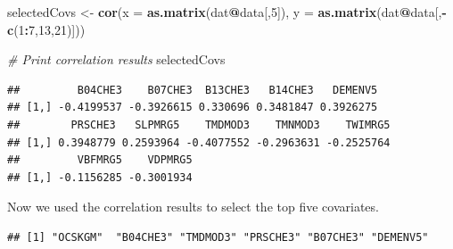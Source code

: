 \documentclass[10pt,b5paper,]{book}
\newenvironment{Shaded}{\begin{snugshade}}{\end{snugshade}}
\newcommand{\CommentTok}[1]{\textcolor[rgb]{0.56,0.35,0.01}{\textit{#1}}}
\newcommand{\DataTypeTok}[1]{\textcolor[rgb]{0.13,0.29,0.53}{#1}}
\newcommand{\DecValTok}[1]{\textcolor[rgb]{0.00,0.00,0.81}{#1}}
\newcommand{\KeywordTok}[1]{\textcolor[rgb]{0.13,0.29,0.53}{\textbf{#1}}}
\newcommand{\NormalTok}[1]{#1}
\newcommand{\OperatorTok}[1]{\textcolor[rgb]{0.81,0.36,0.00}{\textbf{#1}}}
\newcommand{\OtherTok}[1]{\textcolor[rgb]{0.56,0.35,0.01}{#1}}
\newcommand{\StringTok}[1]{\textcolor[rgb]{0.31,0.60,0.02}{#1}}
\theoremstyle{definition}
\theoremstyle{definition}
\theoremstyle{definition}
\theoremstyle{remark}
\begin{document}
\begin{Shaded}
\begin{Highlighting}[]
\NormalTok{selectedCovs <-}\StringTok{ }\KeywordTok{cor}\NormalTok{(}\DataTypeTok{x =} \KeywordTok{as.matrix}\NormalTok{(dat}\OperatorTok{@}\NormalTok{data[,}\DecValTok{5}\NormalTok{]),}
           \DataTypeTok{y =} \KeywordTok{as.matrix}\NormalTok{(dat}\OperatorTok{@}\NormalTok{data[,}\OperatorTok{-}\KeywordTok{c}\NormalTok{(}\DecValTok{1}\OperatorTok{:}\DecValTok{7}\NormalTok{,}\DecValTok{13}\NormalTok{,}\DecValTok{21}\NormalTok{)]))}

\CommentTok{# Print correlation results}
\NormalTok{selectedCovs}
\end{Highlighting}
\end{Shaded}

\begin{verbatim}
##         B04CHE3    B07CHE3  B13CHE3   B14CHE3   DEMENV5
## [1,] -0.4199537 -0.3926615 0.330696 0.3481847 0.3926275
##        PRSCHE3   SLPMRG5    TMDMOD3    TMNMOD3    TWIMRG5
## [1,] 0.3948779 0.2593964 -0.4077552 -0.2963631 -0.2525764
##         VBFMRG5    VDPMRG5
## [1,] -0.1156285 -0.3001934
\end{verbatim}

Now we used the correlation results to select the top five covariates.

\begin{Shaded}
\end{Shaded}

\begin{verbatim}
## [1] "OCSKGM"  "B04CHE3" "TMDMOD3" "PRSCHE3" "B07CHE3" "DEMENV5"
\end{verbatim}
\end{document}
